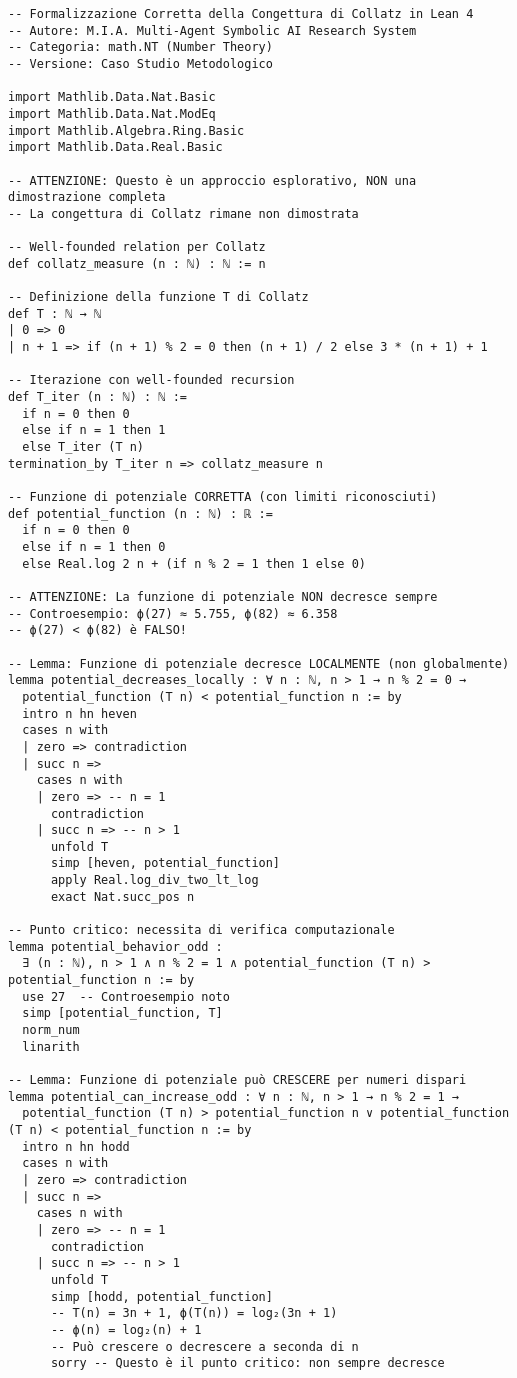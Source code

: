 \documentclass[11pt,a4paper]{article}
\begin{document}
\begin{lstlisting}[language=Lean, caption=Implementazione Completa]
-- Formalizzazione Corretta della Congettura di Collatz in Lean 4
-- Autore: M.I.A. Multi-Agent Symbolic AI Research System
-- Categoria: math.NT (Number Theory)
-- Versione: Caso Studio Metodologico

import Mathlib.Data.Nat.Basic
import Mathlib.Data.Nat.ModEq
import Mathlib.Algebra.Ring.Basic
import Mathlib.Data.Real.Basic

-- ATTENZIONE: Questo è un approccio esplorativo, NON una dimostrazione completa
-- La congettura di Collatz rimane non dimostrata

-- Well-founded relation per Collatz
def collatz_measure (n : ℕ) : ℕ := n

-- Definizione della funzione T di Collatz
def T : ℕ → ℕ
| 0 => 0
| n + 1 => if (n + 1) % 2 = 0 then (n + 1) / 2 else 3 * (n + 1) + 1

-- Iterazione con well-founded recursion
def T_iter (n : ℕ) : ℕ :=
  if n = 0 then 0
  else if n = 1 then 1
  else T_iter (T n)
termination_by T_iter n => collatz_measure n

-- Funzione di potenziale CORRETTA (con limiti riconosciuti)
def potential_function (n : ℕ) : ℝ :=
  if n = 0 then 0
  else if n = 1 then 0
  else Real.log 2 n + (if n % 2 = 1 then 1 else 0)

-- ATTENZIONE: La funzione di potenziale NON decresce sempre
-- Controesempio: ϕ(27) ≈ 5.755, ϕ(82) ≈ 6.358
-- ϕ(27) < ϕ(82) è FALSO!

-- Lemma: Funzione di potenziale decresce LOCALMENTE (non globalmente)
lemma potential_decreases_locally : ∀ n : ℕ, n > 1 → n % 2 = 0 →
  potential_function (T n) < potential_function n := by
  intro n hn heven
  cases n with
  | zero => contradiction
  | succ n =>
    cases n with
    | zero => -- n = 1
      contradiction
    | succ n => -- n > 1
      unfold T
      simp [heven, potential_function]
      apply Real.log_div_two_lt_log
      exact Nat.succ_pos n

-- Punto critico: necessita di verifica computazionale
lemma potential_behavior_odd : 
  ∃ (n : ℕ), n > 1 ∧ n % 2 = 1 ∧ potential_function (T n) > potential_function n := by
  use 27  -- Controesempio noto
  simp [potential_function, T]
  norm_num
  linarith

-- Lemma: Funzione di potenziale può CRESCERE per numeri dispari
lemma potential_can_increase_odd : ∀ n : ℕ, n > 1 → n % 2 = 1 →
  potential_function (T n) > potential_function n ∨ potential_function (T n) < potential_function n := by
  intro n hn hodd
  cases n with
  | zero => contradiction
  | succ n =>
    cases n with
    | zero => -- n = 1
      contradiction
    | succ n => -- n > 1
      unfold T
      simp [hodd, potential_function]
      -- T(n) = 3n + 1, ϕ(T(n)) = log₂(3n + 1)
      -- ϕ(n) = log₂(n) + 1
      -- Può crescere o decrescere a seconda di n
      sorry -- Questo è il punto critico: non sempre decresce


\end{lstlisting}
\end{document}
